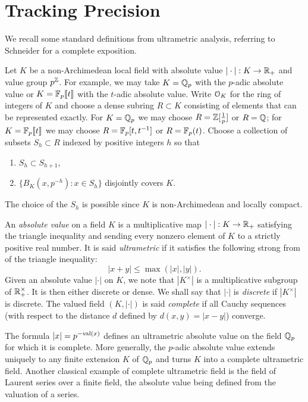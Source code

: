 \documentclass{lms}
\begin{document}

\section{Tracking Precision} \label{sec:prec-proposal}

We recall some standard definitions from ultrametric analysis, referring to
Schneider \cite{Schneider} for a complete exposition.

Let $K$ be a non-Archimedean local field with absolute value
$|\cdot| : K \to \mathbb R_+$ and value group $p^\mathbb Z$.   For example, we may take $K = \mathbb Q_p$ with the
$p$-adic absolute value or $K = \mathbb{F}_p\llbracket t \rrbracket$ with the $t$-adic absolute value.
Write $\OK$ for the ring of integers of $K$ and choose a dense subring $R \subset K$
consisting of elements that can be represented exactly.  For $K = \mathbb Q_p$ we may
choose $R = \mathbb Z[\frac1p]$ or $R = \mathbb Q$; for $K = \mathbb{F}_p\llbracket t \rrbracket$ we may choose
$R = \mathbb{F}_p[t, t^{-1}]$ or $R = \mathbb{F}_p(t)$.  Choose a collection of subsets $S_h \subset R$
indexed by positive integers $h$ so that
\begin{enumerate}
\item $S_h \subset S_{h+1}$,
\item $\{B_K(x, p^{-h}) : x \in S_h\}$ disjointly covers $K$.
\end{enumerate}
The choice of the $S_h$ is possible since $K$ is non-Archimedean and locally compact.


An \emph{absolute value} on a field $K$ is a multiplicative map $|\cdot| 
: K \to \mathbb R_+$ satisfying the triangle inequality and sending every 
nonzero element of $K$ to a strictly positive real number. It is said 
\emph{ultrametric} if it satisfies the following strong from of the 
triangle inequality:
$$|x+y| \leq \max(|x|, |y|).$$
Given an absolute value $|\cdot|$ on $K$, we note that $|K^\times|$ is a 
multiplicative subgroup of $\mathbb R_+^\times$. It is then either discrete or 
dense. We shall say that $|\cdot|$ is \emph{discrete} if $|K^\times|$ is
discrete. The valued field $(K, |\cdot|)$ is said \emph{complete} if all 
Cauchy sequences (with respect to the distance $d$ defined by $d(x,y) = 
|x-y|$) converge.

The formula $|x| = p^{-\text{\rm val}(x)}$ defines an ultrametric absolute value on 
the field $\mathbb Q_p$ for which it is complete. More generally, the $p$-adic 
absolute value extends uniquely to any finite extension $K$ of $\mathbb Q_p$ and 
turns $K$ into a complete ultrametric field. Another classical example of 
complete ultrametric field is the field of Laurent series over a finite
field, the absolute value being defined from the valuation of a series.
\end{document}

